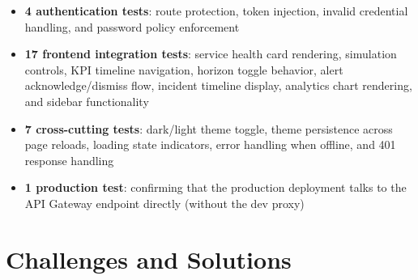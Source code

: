 \documentclass[11pt,a4paper]{article}
\begin{document}
\begin{itemize}[leftmargin=2em]
    \item \textbf{4 authentication tests}: route protection, token injection, invalid credential handling, and password policy enforcement
    \item \textbf{17 frontend integration tests}: service health card rendering, simulation controls, KPI timeline navigation, horizon toggle behavior, alert acknowledge/dismiss flow, incident timeline display, analytics chart rendering, and sidebar functionality
    \item \textbf{7 cross-cutting tests}: dark/light theme toggle, theme persistence across page reloads, loading state indicators, error handling when offline, and 401 response handling
    \item \textbf{1 production test}: confirming that the production deployment talks to the API Gateway endpoint directly (without the dev proxy)
\end{itemize}

\section{Challenges and Solutions}
\end{document}
